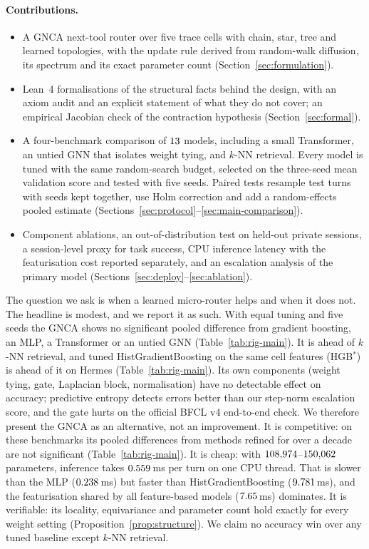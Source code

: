 \documentclass[10pt]{article}
\begin{document}
\paragraph{Contributions.}
\begin{itemize}[leftmargin=1.2em, itemsep=0.1em]
  \item A GNCA next-tool router over five trace cells with chain, star, tree and learned topologies, with the update rule derived from random-walk diffusion, its spectrum and its exact parameter count (Section~\ref{sec:formulation}).
  \item Lean~4 formalisations of the structural facts behind the design, with an axiom audit and an explicit statement of what they do not cover; an empirical Jacobian check of the contraction hypothesis (Section~\ref{sec:formal}).
  \item A four-benchmark comparison of $13$ models, including a small Transformer, an untied GNN that isolates weight tying, and $k$-NN retrieval. Every model is tuned with the same random-search budget, selected on the three-seed mean validation score and tested with five seeds. Paired tests resample test turns with seeds kept together, use Holm correction and add a random-effects pooled estimate (Sections~\ref{sec:protocol}--\ref{sec:main-comparison}).
  \item Component ablations, an out-of-distribution test on held-out private sessions, a session-level proxy for task success, CPU inference latency with the featurisation cost reported separately, and an escalation analysis of the primary model (Sections~\ref{sec:deploy}--\ref{sec:ablation}).
\end{itemize}
The question we ask is when a learned micro-router helps and when it does not. The headline is modest, and we report it as such. With equal tuning and five seeds the GNCA shows no significant pooled difference from gradient boosting, an MLP, a Transformer or an untied GNN (Table~\ref{tab:rig-main}). It is ahead of $k$-NN retrieval, and tuned HistGradientBoosting on the same cell features (HGB$^\ast$) is ahead of it on Hermes (Table~\ref{tab:rig-main}). Its own components (weight tying, gate, Laplacian block, normalisation) have no detectable effect on accuracy; predictive entropy detects errors better than our step-norm escalation score, and the gate hurts on the official BFCL v4 end-to-end check. We therefore present the GNCA as an alternative, not an improvement. It is competitive: on these benchmarks its pooled differences from methods refined for over a decade are not significant (Table~\ref{tab:rig-main}). It is cheap: with $108{,}974$--$150{,}062$ parameters, inference takes $0.559$\,ms per turn on one CPU thread. That is slower than the MLP ($0.238$\,ms) but faster than HistGradientBoosting ($9.781$\,ms), and the featurisation shared by all feature-based models ($7.65$\,ms) dominates. It is verifiable: its locality, equivariance and parameter count hold exactly for every weight setting (Proposition~\ref{prop:structure}). We claim no accuracy win over any tuned baseline except $k$-NN retrieval.
\end{document}
